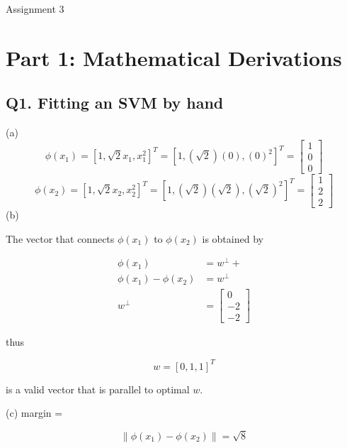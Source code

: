 \documentclass{report}
\begin{document}
\thispagestyle{empty}
\begin{center} \LARGE Assignment 3 \end{center}

\section*{Part 1: Mathematical Derivations}

\subsection*{Q1. Fitting an SVM by hand}
(a)
$$\phi(x_1) = \left[ 1, \sqrt{2}x_1, x_1^2\right]^T
            = \left[ 1, (\sqrt{2})(0), (0)^2\right]^T
            = \begin{bmatrix} 1 \\ 0 \\ 0\end{bmatrix}$$
$$\phi(x_2) = \left[ 1, \sqrt{2}x_2, x_2^2\right]^T
            = \left[ 1, (\sqrt{2})(\sqrt{2}), (\sqrt{2})^2\right]^T
            = \begin{bmatrix} 1 \\ 2 \\ 2\end{bmatrix}$$
(b)

The vector that connects \(\phi(x_1)\) to \(\phi(x_2)\) is obtained by

\begin{equation}
\begin{split}
    \phi(x_1) &= w^\perp + \\
    \phi(x_1) -\phi(x_2) &= w^\perp \\
    w^\perp &= \begin{bmatrix} 0 \\ -2 \\ -2\end{bmatrix}
\end{split}
\end{equation}

thus

\begin{equation}
    w = [0,1,1]^T
\end{equation}

is a valid vector that is parallel to optimal \(w\).

(c)
margin = 

\begin{equation}
    \left\|\phi(x_1)-\phi(x_2)\right\| = \sqrt{8}
\end{equation}
\end{document}
